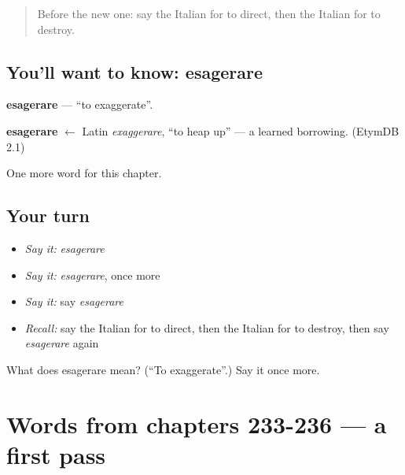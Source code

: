 \label{lesson:IT-C241-esagerare}



\begin{quote}
Before the new one: say the Italian for to direct, then the Italian for to destroy.
\end{quote}

\subsection*{You'll want to know: esagerare}
\textbf{esagerare} — \textquotedblleft{}to exaggerate\textquotedblright{}.

\begin{cousinweb}
\textbf{esagerare} $\leftarrow$ Latin \emph{exaggerare}, \textquotedblleft{}to heap up\textquotedblright{} — a learned borrowing. (EtymDB 2.1)
\end{cousinweb}

\begin{grammarlens}[title={What you've built}]
One more word for this chapter.
\end{grammarlens}

\subsection*{Your turn}
\begin{itemize}
\raggedright
  \item \emph{Say it:} \emph{esagerare}
  \item \emph{Say it:} \emph{esagerare}, once more
  \item \emph{Say it:} say \emph{esagerare}
  \item \emph{Recall:} say the Italian for to direct, then the Italian for to destroy, then say \emph{esagerare} again
\end{itemize}

\begin{tcolorbox}[breakable,colback=teal!4,colframe=teal!35!black,title={Before you move on}]
What does esagerare mean? (\textquotedblleft{}To exaggerate\textquotedblright{}.) Say it once more.
\end{tcolorbox}
\section[(dialogue)]{Words from chapters 233-236 — a first pass}

\label{lesson:IT-R241-first-pass-words-from-chapters-233-236}



